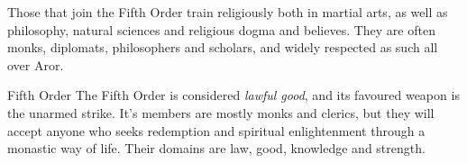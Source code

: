 Those that join the Fifth Order train religiously both in martial arts, as well
as philosophy, natural sciences and religious dogma and believes. They are often
monks, diplomats, philosophers and scholars, and widely respected as such all
over Aror.

\begin{35e}{Fifth Order}
  The Fifth Order is considered \emph{lawful good}, and its favoured weapon is
  the unarmed strike. It's members are mostly monks and clerics, but they will
  accept anyone who seeks redemption and spiritual enlightenment through a
  monastic way of life. Their domains are law, good, knowledge and strength.
\end{35e}
